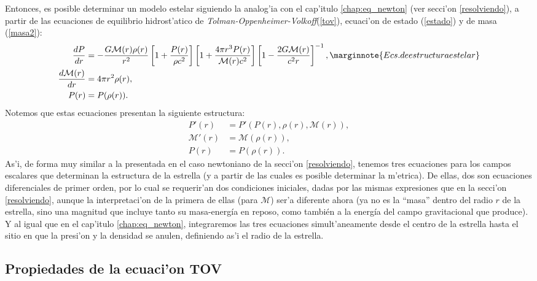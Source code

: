 Entonces, es posible determinar un modelo estelar siguiendo la analog'ia con el cap'itulo \ref{chap:eq_newton} (ver secci'on \ref{resolviendo}), a partir de las ecuaciones de equilibrio hidrost'atico de \emph{Tolman-Oppenheimer-Volkoff}(\ref{tov}), ecuaci'on de estado (\ref{estado}) y de masa (\ref{masa2}):
\begin{align}
\frac{dP}{dr}&=-\frac{G\mathcal{M}(r)\rho(r)}{r^2}\left[ 1+\frac{P(r)}{\rho c^2}\right]\left[ 1+\frac{4\pi r^3P(r)}{\mathcal{M}(r)c^2}\right]\left[ 1-\frac{2G\mathcal{M}(r)}{c^2r}\right]^{-1},\marginnote{Ecs. de estructura estelar} \\
\frac{d\mathcal{M}(r)}{dr}&=4\pi r^2\rho(r),\\
P(r)&=P(\rho(r)).
\end{align}
Notemos que estas ecuaciones presentan la siguiente estructura:
\begin{align}
 P'(r)&=P'(P(r),\rho(r),\mathcal{M}(r)),\\
\mathcal{M}'(r)&=\mathcal{M}(\rho(r)),\\
P(r)&=P(\rho(r)).
\end{align}
As'i, de forma muy similar a la presentada en el caso newtoniano de la secci'on \ref{resolviendo}, tenemos tres ecuaciones para los campos escalares que determinan la estructura de la estrella (y a partir de las cuales es posible determinar la m'etrica). De ellas, dos son ecuaciones diferenciales de primer orden, por lo cual se requerir'an dos condiciones iniciales, dadas por las mismas expresiones que en la secci'on \ref{resolviendo}, aunque la interpretaci'on de la primera de ellas (para $\mathcal{M}$) ser'a diferente ahora (ya no es la ``masa'' dentro del radio $r$ de la estrella, sino una magnitud que incluye tanto su masa-energ\'ia en reposo, como tambi\'en a la energ\'ia del campo gravitacional que produce). Y al igual que en el cap'itulo \ref{chap:eq_newton}, integraremos las tres ecuaciones simult'aneamente desde el centro de la estrella hasta el sitio en que la presi'on y la densidad se anulen, definiendo as'i el radio de la estrella.


\subsection{Propiedades de la ecuaci'on TOV}\label{sec:tov}


